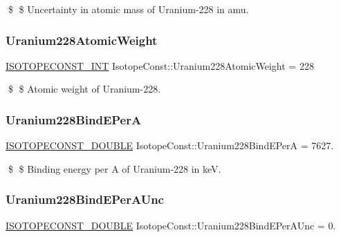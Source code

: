 \$ \$ Uncertainty in atomic mass of Uranium-\/228 in amu. \mbox{\label{group___isotope_const-_uranium-_u228_gaec3c36ec69dfac97b6dfe3ba99b303fd}} 
\subsubsection{\texorpdfstring{Uranium228\+Atomic\+Weight}{Uranium228AtomicWeight}}
{\footnotesize\ttfamily \mbox{\hyperlink{group___isotope_const-_macros_ga5f18360b3e99483a35c32d789e62621c}{I\+S\+O\+T\+O\+P\+E\+C\+O\+N\+S\+T\+\_\+\+I\+NT}} Isotope\+Const\+::\+Uranium228\+Atomic\+Weight = 228}

\$ \$ Atomic weight of Uranium-\/228. \mbox{\label{group___isotope_const-_uranium-_u228_gac67c7c69560fd24c77d64fc3574fda18}} 
\subsubsection{\texorpdfstring{Uranium228\+Bind\+E\+PerA}{Uranium228BindEPerA}}
{\footnotesize\ttfamily \mbox{\hyperlink{group___isotope_const-_macros_ga8f45a7272ce02c0b4c65c44636ed719a}{I\+S\+O\+T\+O\+P\+E\+C\+O\+N\+S\+T\+\_\+\+D\+O\+U\+B\+LE}} Isotope\+Const\+::\+Uranium228\+Bind\+E\+PerA = 7627.}

\$ \$ Binding energy per A of Uranium-\/228 in keV. \mbox{\label{group___isotope_const-_uranium-_u228_gae69adf6ae9fbf86ccde8da857433c1d8}} 
\subsubsection{\texorpdfstring{Uranium228\+Bind\+E\+Per\+A\+Unc}{Uranium228BindEPerAUnc}}
{\footnotesize\ttfamily \mbox{\hyperlink{group___isotope_const-_macros_ga8f45a7272ce02c0b4c65c44636ed719a}{I\+S\+O\+T\+O\+P\+E\+C\+O\+N\+S\+T\+\_\+\+D\+O\+U\+B\+LE}} Isotope\+Const\+::\+Uranium228\+Bind\+E\+Per\+A\+Unc = 0.}


